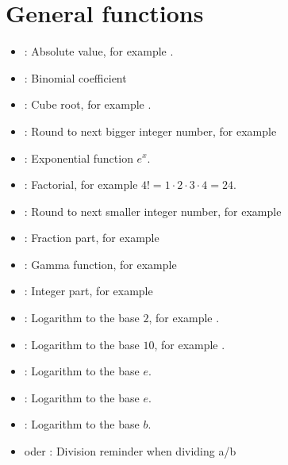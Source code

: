 \chapter{General functions}

\begin{itemize}

\item
{}:
Absolute value, for example .

\item
{}:
Binomial coefficient

\item
{}:
Cube root, for example .

\item
{}:
Round to next bigger integer number, for example 

\item
{}:
Exponential function $e^x$.

\item
{}:
Factorial, for example $4!=1\cdot2\cdot3\cdot4=24$.

\item
{}:
Round to next smaller integer number, for example 

\item
{}:
Fraction part, for example 

\item
{}:
Gamma function, for example 

\item
{}:
Integer part, for example 

\item
{}:
Logarithm to the base $2$, for example .

\item
{}:
Logarithm to the base $10$, for example .

\item
{}:
Logarithm to the base $e$.

\item
{}:
Logarithm to the base $e$.

\item
{}:
Logarithm to the base $b$.

\item
{} oder :
Division reminder when dividing a/b


\end{itemize}
